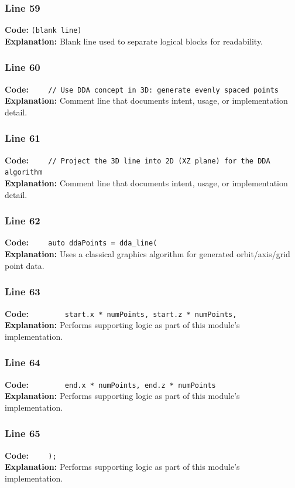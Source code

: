 \documentclass[11pt,a4paper]{article}
\begin{document}
\subsubsection*{Line 59}
\textbf{Code:} \texttt{(blank line)}\\
\textbf{Explanation:} Blank line used to separate logical blocks for readability.

\subsubsection*{Line 60}
\textbf{Code:} \verb|    // Use DDA concept in 3D: generate evenly spaced points|\\
\textbf{Explanation:} Comment line that documents intent, usage, or implementation detail.

\subsubsection*{Line 61}
\textbf{Code:} \verb|    // Project the 3D line into 2D (XZ plane) for the DDA algorithm|\\
\textbf{Explanation:} Comment line that documents intent, usage, or implementation detail.

\subsubsection*{Line 62}
\textbf{Code:} \verb|    auto ddaPoints = dda_line(|\\
\textbf{Explanation:} Uses a classical graphics algorithm for generated orbit/axis/grid point data.

\subsubsection*{Line 63}
\textbf{Code:} \verb|        start.x * numPoints, start.z * numPoints,|\\
\textbf{Explanation:} Performs supporting logic as part of this module's implementation.

\subsubsection*{Line 64}
\textbf{Code:} \verb|        end.x * numPoints, end.z * numPoints|\\
\textbf{Explanation:} Performs supporting logic as part of this module's implementation.

\subsubsection*{Line 65}
\textbf{Code:} \verb|    );|\\
\textbf{Explanation:} Performs supporting logic as part of this module's implementation.
\end{document}
